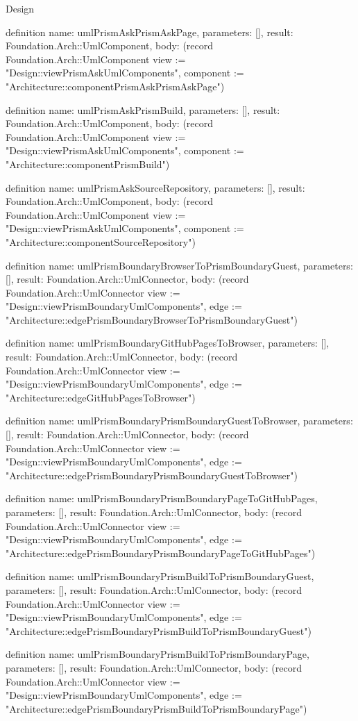\begin{lexlean}{Design}
\begin{semanticmodule}
definition{
  name: umlPrismAskPrismAskPage,
  parameters: [],
  result: Foundation.Arch::UmlComponent,
  body: (record Foundation.Arch::UmlComponent {view := "Design::viewPrismAskUmlComponents", component := "Architecture::componentPrismAskPrismAskPage"})
}

definition{
  name: umlPrismAskPrismBuild,
  parameters: [],
  result: Foundation.Arch::UmlComponent,
  body: (record Foundation.Arch::UmlComponent {view := "Design::viewPrismAskUmlComponents", component := "Architecture::componentPrismBuild"})
}

definition{
  name: umlPrismAskSourceRepository,
  parameters: [],
  result: Foundation.Arch::UmlComponent,
  body: (record Foundation.Arch::UmlComponent {view := "Design::viewPrismAskUmlComponents", component := "Architecture::componentSourceRepository"})
}

definition{
  name: umlPrismBoundaryBrowserToPrismBoundaryGuest,
  parameters: [],
  result: Foundation.Arch::UmlConnector,
  body: (record Foundation.Arch::UmlConnector {view := "Design::viewPrismBoundaryUmlComponents", edge := "Architecture::edgePrismBoundaryBrowserToPrismBoundaryGuest"})
}

definition{
  name: umlPrismBoundaryGitHubPagesToBrowser,
  parameters: [],
  result: Foundation.Arch::UmlConnector,
  body: (record Foundation.Arch::UmlConnector {view := "Design::viewPrismBoundaryUmlComponents", edge := "Architecture::edgeGitHubPagesToBrowser"})
}

definition{
  name: umlPrismBoundaryPrismBoundaryGuestToBrowser,
  parameters: [],
  result: Foundation.Arch::UmlConnector,
  body: (record Foundation.Arch::UmlConnector {view := "Design::viewPrismBoundaryUmlComponents", edge := "Architecture::edgePrismBoundaryPrismBoundaryGuestToBrowser"})
}

definition{
  name: umlPrismBoundaryPrismBoundaryPageToGitHubPages,
  parameters: [],
  result: Foundation.Arch::UmlConnector,
  body: (record Foundation.Arch::UmlConnector {view := "Design::viewPrismBoundaryUmlComponents", edge := "Architecture::edgePrismBoundaryPrismBoundaryPageToGitHubPages"})
}

definition{
  name: umlPrismBoundaryPrismBuildToPrismBoundaryGuest,
  parameters: [],
  result: Foundation.Arch::UmlConnector,
  body: (record Foundation.Arch::UmlConnector {view := "Design::viewPrismBoundaryUmlComponents", edge := "Architecture::edgePrismBoundaryPrismBuildToPrismBoundaryGuest"})
}

definition{
  name: umlPrismBoundaryPrismBuildToPrismBoundaryPage,
  parameters: [],
  result: Foundation.Arch::UmlConnector,
  body: (record Foundation.Arch::UmlConnector {view := "Design::viewPrismBoundaryUmlComponents", edge := "Architecture::edgePrismBoundaryPrismBuildToPrismBoundaryPage"})
}


\end{semanticmodule}
\end{lexlean}
